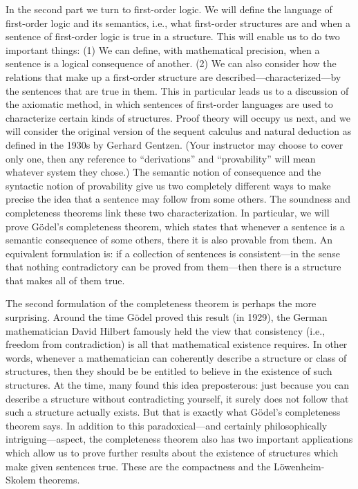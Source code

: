 In the second part we turn to first-order logic. We will define the
language of first-order logic and its semantics, i.e., what
first-order structures are and when a sentence of first-order logic is
true in a structure. This will enable us to do two important things:
(1) We can define, with mathematical precision, when a sentence is a
logical consequence of another. (2) We can also consider how the
relations that make up a first-order structure are
described---characterized---by the sentences that are true in them.
This in particular leads us to a discussion of the axiomatic method,
in which sentences of first-order languages are used to characterize
certain kinds of structures. Proof theory will occupy us next, and we
will consider the original version of the sequent calculus and natural
deduction as defined in the 1930s by Gerhard Gentzen. (Your instructor
may choose to cover only one, then any reference to ``derivations''
and ``provability'' will mean whatever system they chose.) The
semantic notion of consequence and the syntactic notion of provability
give us two completely different ways to make precise the idea that a
sentence may follow from some others. The soundness and completeness
theorems link these two characterization. In particular, we will prove
G\"odel's completeness theorem, which states that whenever a sentence
is a semantic consequence of some others, there it is also provable
from them. An equivalent formulation is: if a collection of sentences
is consistent---in the sense that nothing contradictory can be proved
from them---then there is a structure that makes all of them true.

The second formulation of the completeness theorem is perhaps the more
surprising. Around the time G\"odel proved this result (in 1929), the
German mathematician David Hilbert famously held the view that
consistency (i.e., freedom from contradiction) is all that mathematical
existence requires. In other words, whenever a mathematician can
coherently describe a structure or class of structures, then they
should be be entitled to believe in the existence of such structures.
At the time, many found this idea preposterous: just because you can
describe a structure without contradicting yourself, it surely does
not follow that such a structure actually exists. But that is exactly
what G\"odel's completeness theorem says. In addition to this
paradoxical---and certainly philosophically intriguing---aspect, the
completeness theorem also has two important applications which allow
us to prove further results about the existence of structures which
make given sentences true. These are the compactness and the
L\"owenheim-Skolem theorems.

